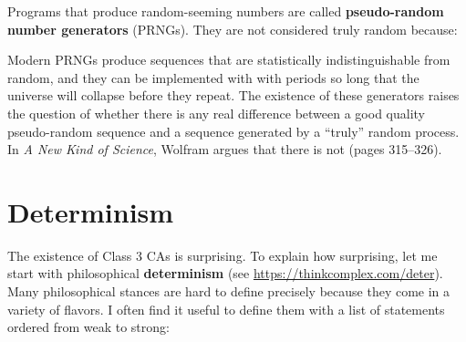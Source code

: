 \documentclass[12pt]{book}
\theoremstyle{exercise}
\newcommand{\py}{\verb}%}
\begin{document}
Programs that produce random-seeming numbers are called
{\bf pseudo-random number generators} (PRNGs).  They are not considered
truly random because:



Modern PRNGs produce sequences that are statistically
indistinguishable from random, and they can be implemented with with
periods so long that the universe will collapse before they repeat.
The existence of these generators raises the question of whether there
is any real difference between a good quality pseudo-random sequence
and a sequence generated by a ``truly'' random process.  In {\em A New
  Kind of Science}, Wolfram argues that there is not (pages 315--326).



\section{Determinism}
\label{determinism}

The existence of Class 3 CAs is surprising.  To explain how
surprising, let me start with philosophical
{\bf determinism} (see \url{https://thinkcomplex.com/deter}).
Many philosophical stances are hard to define precisely because
they come in a variety of flavors.  I often find it useful
to define them with a list of statements ordered from weak
to strong:
\end{document}
